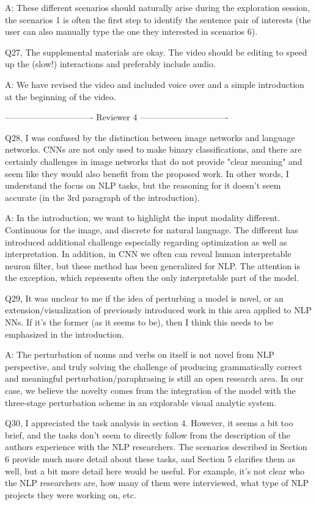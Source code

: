 A: These different scenarios should naturally arise during the exploration session, the scenarios 1 is often the first step to identify the sentence pair of interests (the user can also manually type the one they interested in scenarios 6).

Q27, The supplemental materials are okay. The video should be editing to speed up the (slow!) interactions and preferably include audio.

A: We have revised the video and included voice over and a simple introduction at the beginning of the video.


------------------------------- Reviewer 4 -------------------------------

Q28, I was confused by the distinction between image networks and language networks. CNNs are not only used to make binary classifications, and there are certainly challenges in image networks that do not provide "clear meaning" and seem like they would also benefit from the proposed work. In other words, I understand the focus on NLP tasks, but the reasoning for it doesn't seem accurate (in the 3rd paragraph of the introduction).

A: In the introduction, we want to highlight the input modality different. Continuous for the image, and discrete for natural language. The different has introduced additional challenge especially regarding optimization as well as interpretation. In addition, in CNN we often can reveal human interpretable neuron filter, but these method has been generalized for NLP. The attention is the exception, which represents often the only interpretable part of the model.

Q29, It was unclear to me if the idea of perturbing a model is novel, or an extension/visualization of previously introduced work in this area applied to NLP NNs. If it's the former (as it seems to be), then I think this needs to be emphasized in the introduction.

A: The perturbation of nouns and verbs on itself is not novel from NLP perspective, and truly solving the challenge of producing grammatically correct and meaningful perturbation/paraphrasing is still an open research area. In our case, we believe the novelty comes from the integration of the model with the three-stage perturbation scheme in an explorable visual analytic system.

Q30, I appreciated the task analysis in section 4. However, it seems a bit too brief, and the tasks don't seem to directly follow from the description of the authors experience with the NLP researchers. The scenarios described in Section 6 provide much more detail about these tasks, and Section 5 clarifies them as well, but a bit more detail here would be useful. For example, it's not clear who the NLP researchers are, how many of them were interviewed, what type of NLP projects they were working on, etc.

